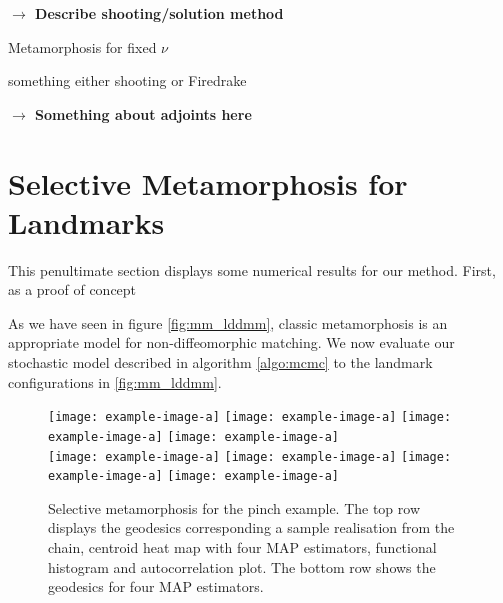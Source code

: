 \documentclass[runningheads]{llncs}
\begin{document}
\textbf{$\longrightarrow$ Describe shooting/solution method}\\
\begin{algorithm}[h!]
\begin{algorithmic}
\caption{Metamorphosis for fixed $\nu$}
\State something either shooting or Firedrake
\EndProcedure
\end{algorithmic}
\end{algorithm}

\textbf{$\longrightarrow$ Something about adjoints here}\\

\section{Selective Metamorphosis for Landmarks}\label{sec:numerical}

This penultimate section displays some numerical results for our method. First,
as a proof of concept 

As we have seen in figure \ref{fig:mm_lddmm}, classic metamorphosis is an
appropriate model for non-diffeomorphic matching. We now evaluate our stochastic
model described in algorithm \ref{algo:mcmc} to the landmark configurations in
\ref{fig:mm_lddmm}.

\begin{figure}
\centering
\begin{minipage}{\textwidth}
  \centering
    \texttt{[image: example-image-a]}\quad
    \texttt{[image: example-image-a]}\quad
    \texttt{[image: example-image-a]}\quad
    \texttt{[image: example-image-a]}\\[0.25cm]
    \texttt{[image: example-image-a]}\quad
    \texttt{[image: example-image-a]}\quad
    \texttt{[image: example-image-a]}\quad
    \texttt{[image: example-image-a]}
    \caption{Selective metamorphosis for the pinch example. The top row displays
    the geodesics corresponding a sample realisation from the chain, centroid
    heat map with four MAP estimators, functional histogram and autocorrelation
    plot. The bottom row shows the geodesics for four MAP estimators.}
    \label{fig:selective:pinch}
\end{minipage}
\end{figure}
\end{document}

